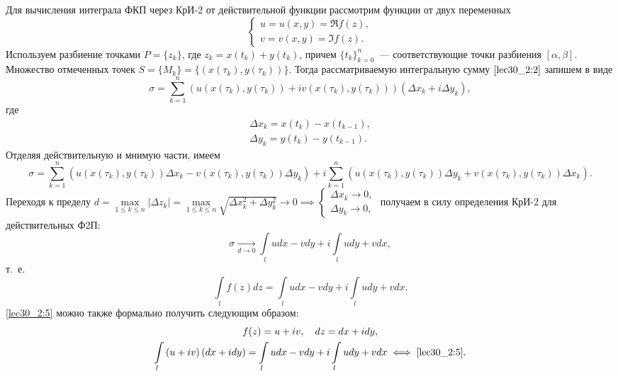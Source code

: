 \documentclass[../../main.tex]{subfiles}
\begin{document}
Для вычисления интеграла ФКП через КрИ-2 от действительной функции 
рассмотрим функции от двух переменных
\begin{equation*}
 \begin{cases}
  u = u\left(x, y\right) = \Re f(z),\\
  v = v\left(x, y\right) = \Im f(z).
 \end{cases}
\end{equation*}
Используем разбиение точками $P = \{z_k\}$, где $z_k = x(t_k) + y(t_k)$, 
причем $\{t_k\}_{k=0}^n $~--- соответствующие точки разбиения 
$\left[\alpha,\beta\right]$. Множество отмеченных точек
$S = \{M_k\} = \{(x(\tau_k), y(\tau_k))\}$. Тогда рассматриваемую интегральную 
сумму 
$\eqref{lec30_2:2}$ запишем в виде
\[\sigma = \sum\limits_{k=1}^n{\left(u(x(\tau_k), y(\tau_k))
+ iv(x(\tau_k), y(\tau_k))\right)\left(\Delta x_k + 
i\Delta y_k\right)},\] 
где
\begin{gather*}
\Delta x_k = x(t_k) - x(t_{k-1}),\\
\Delta y_k = y(t_k) - y(t_{k-1}).
\end{gather*}
Отделяя действительную и мнимую части, имеем
\[
\sigma = \sum_{k=1}^n{(u(x(\tau_k), y(\tau_k))\Delta x_k -
v(x(\tau_k), y(\tau_k))\Delta y_k)} + 
i\sum_{k=1}^n{(u(x(\tau_k), y(\tau_k))\Delta y_k + 
v(x(\tau_k), y(\tau_k))\Delta x_k)}.
\]
Переходя к пределу 
$d = \underset{1 \leq k \leq n}{\max}|\Delta z_k| = 
\underset{1 \leq k \leq n}{\max}\sqrt{\Delta x_k^2 + \Delta y_k^2}
\longrightarrow 0 \implies
\begin{cases}
    \Delta x_k \longrightarrow 0,\\
    \Delta y_k \longrightarrow 0,
\end{cases}$ \hspace{-1em}
получаем в силу определения КрИ-2 для действительных Ф2П:
\[
\sigma \underset{d \to 0}{\longrightarrow} \int\limits_l{
udx - vdy} + i\int\limits_l{udy + vdx},
\]
т.~е.
\begin{equation}
    \label{lec30_2:5}    
    \int\limits_{l}{f(z)dz} = \int\limits_l{udx - vdy} + 
    i\int\limits_l{udy + vdx}.
\end{equation}
\eqref{lec30_2:5} можно также формально получить следующим образом:
\begin{gather*}
f(z) = u + iv, \quad
dz = dx + idy, \\
\int\limits_l{\left(u+iv\right)\left(dx + idy\right)} = 
\int\limits_l{udx - vdy} + i\int\limits_l{udy + vdx} 
\iff \eqref{lec30_2:5}.
\end{gather*}
\end{document}
